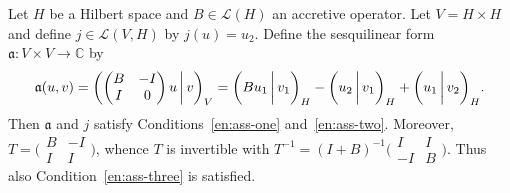 \documentclass[a4paper,oneside,12pt]{amsart}
\theoremstyle{plain}
\theoremstyle{definition}
\newenvironment{example}
{\pushQED{\qed}

\examplex}
{\popQED\endexamplex}
\begin{document}
\begin{example}\label{ex:gen-inverse}
Let $H$ be a Hilbert space and $B\in{\mathcal{L}}(H)$ an accretive operator. Let $V=H\times H$ and define $j\in{\mathcal{L}}(V,H)$ by $j(u)=u_2$.
Define the sesquilinear form ${{\mathfrak{{a}}}}\colon V\times V\to{\mathbb{C}}$ by
\[
    {{\mathfrak{{a}}}}(u,v)=\begingroup{{\ifthenelse{\equal{auto}{auto}}{\left({\begin{pmatrix} B & -I\\ I & 0\end{pmatrix}u}\mkern3mu{\biggm|}\mkern3mu {v}\right)}{}
\ifthenelse{\equal{auto}{b}}{\bigl({\begin{pmatrix} B & -I\\ I & 0\end{pmatrix}u}\mkern3mu{\biggm|}\mkern3mu {v}\bigr)}{}
\ifthenelse{\equal{auto}{B}}{\Bigl({\begin{pmatrix} B & -I\\ I & 0\end{pmatrix}u}\mkern3mu{\bigm|}\mkern3mu {v}\Bigr)}{}
}}_V\endgroup={{\ifthenelse{\equal{auto}{auto}}{\left({Bu_1}\mkern3mu{\biggm|}\mkern3mu {v_1}\right)}{}
\ifthenelse{\equal{auto}{b}}{\bigl({Bu_1}\mkern3mu{\biggm|}\mkern3mu {v_1}\bigr)}{}
\ifthenelse{\equal{auto}{B}}{\Bigl({Bu_1}\mkern3mu{\bigm|}\mkern3mu {v_1}\Bigr)}{}
}}_H - {{\ifthenelse{\equal{auto}{auto}}{\left({u_2}\mkern3mu{\biggm|}\mkern3mu {v_1}\right)}{}
\ifthenelse{\equal{auto}{b}}{\bigl({u_2}\mkern3mu{\biggm|}\mkern3mu {v_1}\bigr)}{}
\ifthenelse{\equal{auto}{B}}{\Bigl({u_2}\mkern3mu{\bigm|}\mkern3mu {v_1}\Bigr)}{}
}}_H + {{\ifthenelse{\equal{auto}{auto}}{\left({u_1}\mkern3mu{\biggm|}\mkern3mu {v_2}\right)}{}
\ifthenelse{\equal{auto}{b}}{\bigl({u_1}\mkern3mu{\biggm|}\mkern3mu {v_2}\bigr)}{}
\ifthenelse{\equal{auto}{B}}{\Bigl({u_1}\mkern3mu{\bigm|}\mkern3mu {v_2}\Bigr)}{}
}}_H.
\]
Then ${{\mathfrak{{a}}}}$ and $j$ satisfy Conditions~\ref{en:ass-one} and~\ref{en:ass-two}.
Moreover, $T=\bigl(\begin{smallmatrix} B & -I\\ I & I\end{smallmatrix}\bigr)$, 
whence $T$ is invertible with $T^{-1}=(I+B)^{-1}\bigl(\begin{smallmatrix} I & I\\ -I & B\end{smallmatrix}\bigr)$. Thus also
Condition~\ref{en:ass-three} is satisfied.


\end{example}
\end{document}
